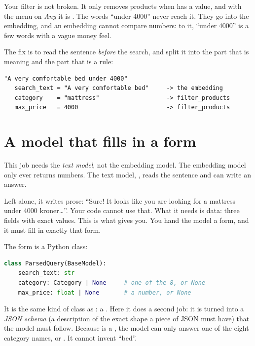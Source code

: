 \documentclass[11pt]{article}
\begin{document}
Your filter is not broken. It only removes products when
 has a value, and with the menu on \emph{Any}
it is . The words ``under 4000'' never reach it. They go
into the embedding, and an embedding cannot compare numbers: to it,
``under 4000'' is a few words with a vague money feel.

The fix is to read the sentence \emph{before} the search, and split it
into the part that is meaning and the part that is a rule:
\begin{lstlisting}
"A very comfortable bed under 4000"
   search_text = "A very comfortable bed"     -> the embedding
   category    = "mattress"                   -> filter_products
   max_price   = 4000                         -> filter_products
\end{lstlisting}

\section{A model that fills in a form}

This job needs the \emph{text model}, not the embedding model. The
embedding model only ever returns numbers. The text model,
, reads the sentence and can write an
answer.

Left alone, it writes prose: ``Sure! It looks like you are looking for
a mattress under 4000 kroner\ldots''. Your code cannot use that. What
it needs is data: three fields with exact values. This is what
 gives you. You hand the model a form, and it
must fill in exactly that form.

The form is a Python class:
\begin{lstlisting}[language=Python]
class ParsedQuery(BaseModel):
    search_text: str
    category: Category | None     # one of the 8, or None
    max_price: float | None       # a number, or None
\end{lstlisting}
It is the same kind of class as : a
. Here it does a second job: it is
turned into a \emph{JSON schema} (a description of the exact shape a
piece of JSON must have) that the model must follow. Because
 is a , the model can only answer one of
the eight category names, or . It cannot invent ``bed''.
\end{document}
